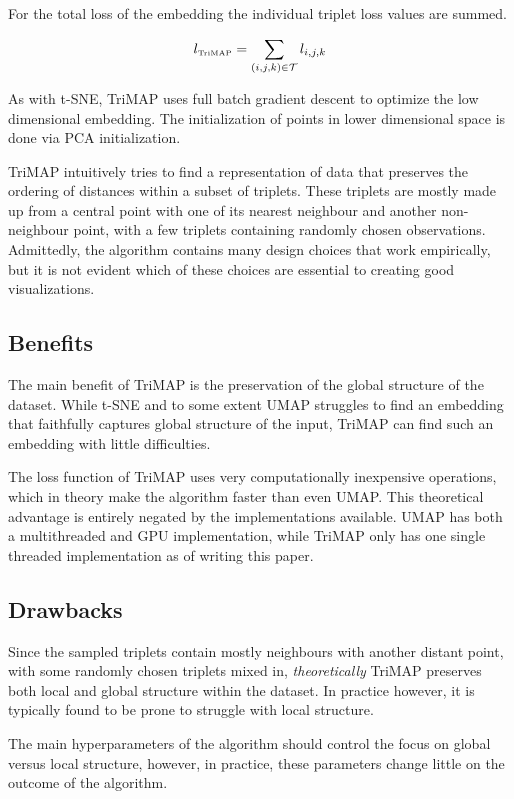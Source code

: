 For the total loss of the embedding the individual triplet loss values are summed.

\begin{equation}
	l_{\text{\tiny TriMAP}} = \sum_{(i,j,k)\in\mathcal{T}}l_{i,j,k}
\end{equation}

As with t-SNE, TriMAP uses full batch gradient descent to optimize the low dimensional embedding. The initialization of points in lower dimensional space is done via PCA initialization. 

TriMAP intuitively tries to find a representation of data that preserves the ordering of distances within a subset of triplets. These triplets are mostly made up from a central point with one of its nearest neighbour and another non-neighbour point, with a few triplets containing randomly chosen observations. Admittedly, the algorithm contains many design choices that work empirically, but it is not evident which of these choices are essential to creating good visualizations.

\subsection{Benefits}

The main benefit of TriMAP is the preservation of the global structure of the dataset. While t-SNE and to some extent UMAP struggles to find an embedding that faithfully captures global structure of the input, TriMAP can find such an embedding with little difficulties.

The loss function of TriMAP uses very computationally inexpensive operations, which in theory make the algorithm faster than even UMAP. This theoretical advantage is entirely negated by the implementations available. UMAP has both a multithreaded and GPU implementation, while TriMAP only has one single threaded implementation as of writing this paper.

\subsection{Drawbacks}

Since the sampled triplets contain mostly neighbours with another distant point, with some randomly chosen triplets mixed in, \textit{theoretically} TriMAP preserves both local and global structure within the dataset. In practice however, it is typically found to be prone to struggle with local structure.

The main hyperparameters of the algorithm should control the focus on global versus local structure, however, in practice, these parameters change little on the outcome of the algorithm.

